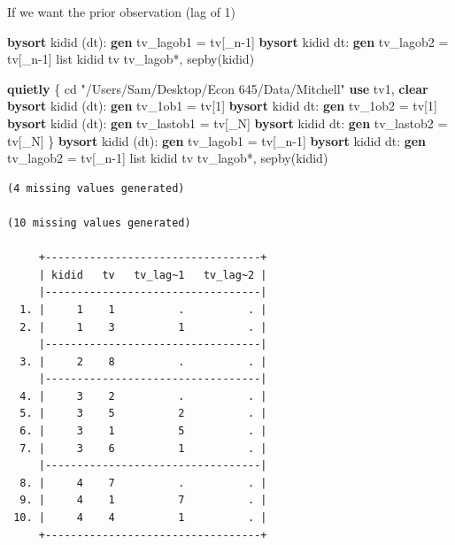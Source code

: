 \documentclass[
]{book}
\newenvironment{Shaded}{\begin{snugshade}}{\end{snugshade}}
\newcommand{\DataTypeTok}[1]{\textcolor[rgb]{0.13,0.29,0.53}{#1}}
\newcommand{\KeywordTok}[1]{\textcolor[rgb]{0.13,0.29,0.53}{\textbf{#1}}}
\newcommand{\NormalTok}[1]{#1}
\newcommand{\OtherTok}[1]{\textcolor[rgb]{0.56,0.35,0.01}{#1}}
\newcommand{\StringTok}[1]{\textcolor[rgb]{0.31,0.60,0.02}{#1}}
\begin{document}
If we want the prior observation (lag of 1)

\begin{Shaded}
\begin{Highlighting}[]
\KeywordTok{bysort}\NormalTok{ kidid (dt): }\KeywordTok{gen}\NormalTok{ tv\_lagob1 = tv[}\DataTypeTok{\_n}\NormalTok{{-}1]}
\KeywordTok{bysort}\NormalTok{ kidid dt: }\KeywordTok{gen}\NormalTok{ tv\_lagob2 = tv[}\DataTypeTok{\_n}\NormalTok{{-}1]}
\OtherTok{list}\NormalTok{ kidid tv tv\_lagob*, sepby(kidid)}
\end{Highlighting}
\end{Shaded}

\begin{Shaded}
\begin{Highlighting}[]
\KeywordTok{quietly}\NormalTok{ \{}
\NormalTok{cd }\StringTok{"/Users/Sam/Desktop/Econ 645/Data/Mitchell"}
\KeywordTok{use}\NormalTok{ tv1, }\KeywordTok{clear}
\KeywordTok{bysort}\NormalTok{ kidid (dt): }\KeywordTok{gen}\NormalTok{ tv\_1ob1 = tv[1]}
\KeywordTok{bysort}\NormalTok{ kidid dt: }\KeywordTok{gen}\NormalTok{ tv\_1ob2 = tv[1]}
\KeywordTok{bysort}\NormalTok{ kidid (dt): }\KeywordTok{gen}\NormalTok{ tv\_lastob1 = tv[\_N]}
\KeywordTok{bysort}\NormalTok{ kidid dt: }\KeywordTok{gen}\NormalTok{ tv\_lastob2 = tv[\_N]}
\NormalTok{\}}
\KeywordTok{bysort}\NormalTok{ kidid (dt): }\KeywordTok{gen}\NormalTok{ tv\_lagob1 = tv[}\DataTypeTok{\_n}\NormalTok{{-}1]}
\KeywordTok{bysort}\NormalTok{ kidid dt: }\KeywordTok{gen}\NormalTok{ tv\_lagob2 = tv[}\DataTypeTok{\_n}\NormalTok{{-}1]}
\OtherTok{list}\NormalTok{ kidid tv tv\_lagob*, sepby(kidid)}
\end{Highlighting}
\end{Shaded}

\begin{verbatim}
(4 missing values generated)

(10 missing values generated)

     +----------------------------------+
     | kidid   tv   tv_lag~1   tv_lag~2 |
     |----------------------------------|
  1. |     1    1          .          . |
  2. |     1    3          1          . |
     |----------------------------------|
  3. |     2    8          .          . |
     |----------------------------------|
  4. |     3    2          .          . |
  5. |     3    5          2          . |
  6. |     3    1          5          . |
  7. |     3    6          1          . |
     |----------------------------------|
  8. |     4    7          .          . |
  9. |     4    1          7          . |
 10. |     4    4          1          . |
     +----------------------------------+
\end{verbatim}
\end{document}
